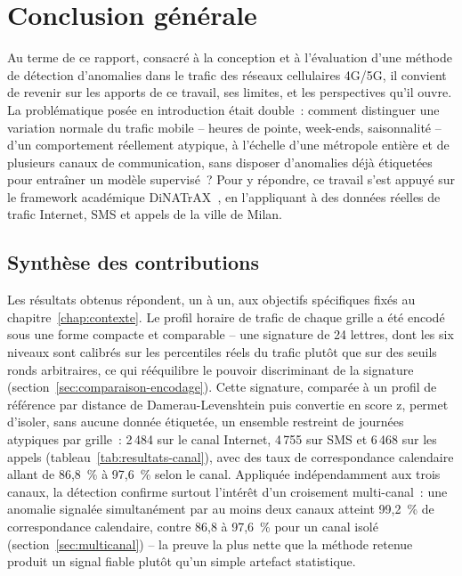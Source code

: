 \chapter*{Conclusion générale}
\label{ch:conclusion}

Au terme de ce rapport, consacré à la conception et à l'évaluation
d'une méthode de détection d'anomalies dans le trafic des réseaux
cellulaires 4G/5G, il convient de revenir sur les apports de ce
travail, ses limites, et les perspectives qu'il ouvre. La
problématique posée en introduction était double~: comment distinguer
une variation normale du trafic mobile -- heures de pointe,
week-ends, saisonnalité -- d'un comportement réellement atypique, à
l'échelle d'une métropole entière et de plusieurs canaux de
communication, sans disposer d'anomalies déjà étiquetées pour
entraîner un modèle supervisé~? Pour y répondre, ce travail s'est
appuyé sur le framework académique
DiNATrAX~\parencite{maudoux2024dinatrax}, en l'appliquant à des
données réelles de trafic Internet, SMS et appels de la ville de
Milan.

\section*{Synthèse des contributions}

Les résultats obtenus répondent, un à un, aux objectifs spécifiques
fixés au chapitre~\ref{chap:contexte}. Le profil horaire de trafic de
chaque grille a été encodé sous une forme compacte et comparable --
une signature de 24 lettres, dont les six niveaux sont calibrés sur
les percentiles réels du trafic plutôt que sur des seuils ronds
arbitraires, ce qui rééquilibre le pouvoir discriminant de la
signature (section~\ref{sec:comparaison-encodage}). Cette signature,
comparée à un profil de référence par distance de
Damerau-Levenshtein puis convertie en score z, permet d'isoler, sans
aucune donnée étiquetée, un ensemble restreint de journées atypiques
par grille~: 2\,484 sur le canal Internet, 4\,755 sur SMS et 6\,468
sur les appels (tableau~\ref{tab:resultats-canal}), avec des taux de
correspondance calendaire allant de 86,8~\% à 97,6~\% selon le canal.
Appliquée indépendamment aux trois canaux, la détection confirme
surtout l'intérêt d'un croisement multi-canal~: une anomalie signalée
simultanément par au moins deux canaux atteint 99,2~\% de
correspondance calendaire, contre 86,8 à 97,6~\% pour un canal isolé
(section~\ref{sec:multicanal}) -- la preuve la plus nette que la
méthode retenue produit un signal fiable plutôt qu'un simple artefact
statistique.

